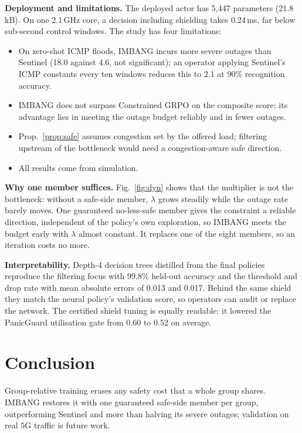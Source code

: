 \documentclass[journal]{IEEEtran}
\begin{document}
\textbf{Deployment and limitations.} The deployed actor has 5{,}447 parameters (21.8\,kB). On one 2.1\,GHz core, a decision including shielding takes 0.24\,ms, far below sub-second control windows. The study has four limitations:
\begin{itemize}
\item On zero-shot ICMP floods, IMBANG incurs more severe outages than Sentinel (18.0 against 4.6, not significant); an operator applying Sentinel's ICMP constants every ten windows reduces this to 2.1 at 90\% recognition accuracy.
\item IMBANG does not surpass Constrained GRPO on the composite score; its advantage lies in meeting the outage budget reliably and in fewer outages.
\item Prop.~\ref{prop:safe} assumes congestion set by the offered load; filtering upstream of the bottleneck would need a congestion-aware safe direction.
\item All results come from simulation.
\end{itemize}

\textbf{Why one member suffices.} Fig.~\ref{fig:dyn} shows that the multiplier is not the bottleneck: without a safe-side member, $\lambda$ grows steadily while the outage rate barely moves. One guaranteed no-less-safe member gives the constraint a reliable direction, independent of the policy's own exploration, so IMBANG meets the budget early with $\lambda$ almost constant. It replaces one of the eight members, so an iteration costs no more.

\textbf{Interpretability.} Depth-4 decision trees distilled from the final policies reproduce the filtering focus with 99.8\% held-out accuracy and the threshold and drop rate with mean absolute errors of 0.013 and 0.017. Behind the same shield they match the neural policy's validation score, so operators can audit or replace the network. The certified shield tuning is equally readable: it lowered the PanicGuard utilisation gate from 0.60 to 0.52 on average.

\section{Conclusion}
Group-relative training erases any safety cost that a whole group shares. IMBANG restores it with one guaranteed safe-side member per group, outperforming Sentinel and more than halving its severe outages; validation on real 5G traffic is future work.



\end{document}
